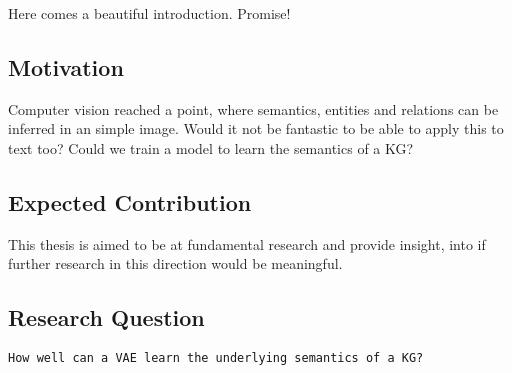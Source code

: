Here comes a beautiful introduction. Promise!

\subsection{Motivation}

Computer vision reached a point, where semantics, entities and relations can be inferred in an simple image.
Would it not be fantastic to be able to apply this to text too?
Could we train a model to learn the semantics of a KG?

\subsection{Expected Contribution}

This thesis is aimed to be at fundamental research and provide insight, into if further research in this direction would be meaningful.

\subsection{Research Question}

\texttt{How well can a VAE learn the underlying semantics of a KG?}
